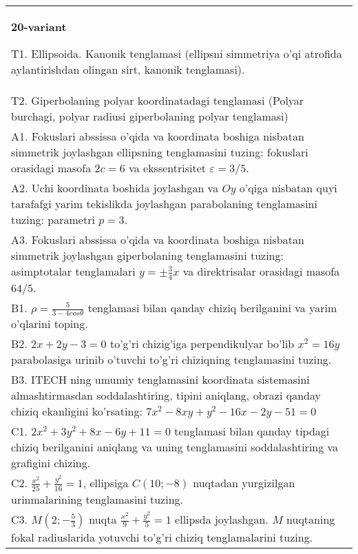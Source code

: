 \documentclass{article}
\begin{document}
\begin{tabular}{m{17cm}}
\textbf{20-variant}
\newline

T1. Ellipsoida. Kanonik tenglamasi (ellipsni simmetriya o'qi atrofida aylantirishdan olingan sirt, kanonik tenglamasi).\\

T2. Giperbolaning polyar koordinatadagi tenglamasi (Polyar burchagi, polyar radiusi giperbolaning polyar tenglamasi)\\

A1. Fokuslari abssissa o'qida va koordinata boshiga nisbatan simmetrik joylashgan ellipsning tenglamasini tuzing: fokuslari orasidagi masofa $2c=6$ va ekssentrisitet $\varepsilon=3/5$.\\

A2. Uchi koordinata boshida joylashgan va $Oy$ o'qiga nisbatan quyi tarafafgi yarim tekislikda joylashgan parabolaning tenglamasini tuzing: parametri $p=3$.\\

A3. Fokuslari abssissa o'qida va koordinata boshiga nisbatan simmetrik joylashgan giperbolaning tenglamasini tuzing: asimptotalar tenglamalari $y=\pm \frac{3}{4}x$ va direktrisalar orasidagi masofa $64/5$.\\

B1. $\rho = \frac{5}{3 - 4cos\theta}$ tenglamasi bilan qanday chiziq berilganini va yarim o'qlarini toping.  \\

B2. $2x + 2y - 3 = 0$ to'g'ri chizig'iga perpendikulyar bo'lib $x^{2} = 16y$ parabolasiga urinib o'tuvchi to'g'ri chiziqning tenglamasini tuzing.  \\

B3. ITECH ning umumiy tenglamasini koordinata sistemasini almashtirmasdan soddalashtiring, tipini aniqlang, obrazi qanday chiziq ekanligini ko'rsating: $7x^{2} - 8xy + y^{2} - 16x - 2y - 51 = 0$\\

C1. $2x^{2} + 3y^{2} + 8x - 6y + 11 = 0$ tenglamasi bilan qanday tipdagi chiziq berilganini aniqlang va uning tenglamasini soddalashtiring va grafigini chizing.  \\

C2. $\frac{x^{2}}{25} + \frac{y^{2}}{16} = 1$, ellipsiga $C(10; - 8)$ nuqtadan yurgizilgan urinmalarining tenglamasini tuzing.  \\

C3. $M(2; - \frac{5}{3})$ nuqta $\frac{x^{2}}{9} + \frac{y^{2}}{5} = 1$ ellipsda joylashgan. $M$ nuqtaning fokal radiuslarida yotuvchi to'g'ri chiziq tenglamalarini tuzing.  \\

\end{tabular}
\vspace{1cm}
\end{document}
